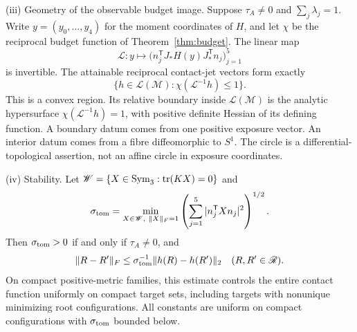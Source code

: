 \begin{corollary}
\smallskip\noindent\textup{(iii) Geometry of the observable budget image.}
Suppose $\tau_A\ne0$ and $\sum_j\lambda_j=1$. Write $y=(y_0,\ldots,y_4)$ for the moment coordinates of $H$, and let $\chi$ be the reciprocal budget function of Theorem~\ref{thm:budget}. The linear map
\[
 \mathcal L:y\longmapsto\big(n_j^{\mathsf T}J_*H(y)J_*^{\mathsf T}n_j\big)_{j=1}^5
\]
is invertible. The attainable reciprocal contact-jet vectors form exactly
\begin{equation}\label{eq:contact-budget-image}
 \{h\in\mathcal L(\mathscr M):\chi(\mathcal L^{-1}h)\le1\}.
\end{equation}
This is a convex region. Its relative boundary inside $\mathcal L(\mathscr M)$ is the analytic hypersurface $\chi(\mathcal L^{-1}h)=1$, with positive definite Hessian of its defining function. A boundary datum comes from one positive exposure vector. An interior datum comes from a fibre diffeomorphic to $S^1$. The circle is a differential-topological assertion, not an affine circle in exposure coordinates.

\smallskip\noindent\textup{(iv) Stability.}
Let $\mathscr W=\{X\in\operatorname{Sym}_3:\operatorname{tr}(KX)=0\}$ and
\begin{equation}\label{eq:tomography-margin}
 \sigma_{\rm tom}=\min_{X\in\mathscr W,\ \|X\|_F=1}
    \left(\sum_{j=1}^5|n_j^{\mathsf T}Xn_j|^2\right)^{1/2}.
\end{equation}
Then $\sigma_{\rm tom}>0$ if and only if $\tau_A\ne0$, and
\[
 \|R-R'\|_F\le\sigma_{\rm tom}^{-1}\|h(R)-h(R')\|_2
 \quad(R,R'\in\mathscr R).
\]
On compact positive-metric families, this estimate controls the entire contact function uniformly on compact target sets, including targets with nonunique minimizing root configurations. All constants are uniform on compact configurations with $\sigma_{\rm tom}$ bounded below.
\end{corollary}

